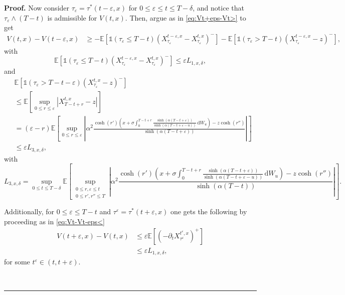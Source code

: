 \documentclass{tufte-handout}
\newcommand{\E}{\mathbb{E}} %
\newenvironment{pf}[1][Proof]{\textbf{#1.} }{\ \rule{0.5em}{0.5em}}
\begin{document}
\begin{pf}
		Now consider $\tau_\varepsilon = \tau^*(t - \varepsilon, x)$ for $0 \leq \varepsilon \leq t \leq T - \delta$, and notice that $\tau_\varepsilon\wedge(T - t)$ is admissible for $V(t, x)$. Then, argue as in \eqref{eq:Vt+eps-Vt>} to get
		\begin{align*}
		V(t, x) - V(t - \varepsilon, x)
		&\geq -\E\left[\mathbb{1}(\tau_\varepsilon\leq T - t)\left(X_{\tau_\varepsilon}^{t - \varepsilon, x} - X_{\tau_\varepsilon}^{t, x}\right)^-\right] - \E\left[\mathbb{1}(\tau_\varepsilon > T - t)\left(X_{\tau_\varepsilon}^{t - \varepsilon, x} - z\right)^-\right],
		\end{align*}
		with
		$$
		\E\left[\mathbb{1}(\tau_\varepsilon\leq T - t)\left(X_{\tau_\varepsilon}^{t - \varepsilon, x} - X_{\tau_\varepsilon}^{t, x}\right)^-\right] \leq \varepsilon L_{1, x, \delta},
		$$ 
		and
		\begin{align*}
		&\E\left[\mathbb{1}(\tau_\varepsilon > T - t - \varepsilon)\left(X_{\tau_\varepsilon}^{t, x} - z\right)^-\right] \\
		&\leq \E\left[\sup_{0 \leq r\leq \varepsilon}\left|X_{T - t + r}^{t, x} - z\right|\right] \\
		&= (\varepsilon - r)\E\left[\sup_{0 \leq r\leq \varepsilon}\left|\alpha^2\frac{\cosh(r')\left(x + \sigma\int_{0}^{T - t + r} \frac{\sinh(\alpha (T - t + \varepsilon))}{\sinh(\alpha (T - t + \varepsilon - u))}\,\mathrm{d}W_u\right) - z\cosh(r'')}{\sinh(\alpha (T - t + \varepsilon))}\right|\right] \\
		&\leq  \varepsilon L_{3, x, \delta},
		\end{align*}
		with
		$$
		L_{3, x, \delta} = \sup_{0\leq t\leq T - \delta} \E\left[\sup_{\substack{0 \leq r, \varepsilon\leq t \\ 0 \leq r', r''\leq T}}\left|\alpha^2\frac{\cosh(r')\left(x + \sigma\int_{0}^{T - t + r} \frac{\sinh(\alpha (T - t + \varepsilon))}{\sinh(\alpha (T - t + \varepsilon - u))}\,\mathrm{d}W_u\right) - z\cosh(r'')}{\sinh(\alpha (T - t))}\right|\right].
		$$
		
		Additionally, for $0 \leq \varepsilon \leq T - t $ and $\tau^\varepsilon = \tau^*(t + \varepsilon, x)$ one gets the following by proceeding as in \eqref{eq:Vt-Vt-eps<}
		\begin{align}
		V(t + \varepsilon, x) - V(t, x) 
		&\leq \varepsilon\E\left[\left(-\partial_tX_{\tau^\varepsilon}^{t^\varepsilon, x}\right)^+\right] \nonumber \\
		&\leq  \varepsilon L_{1, x, \delta},
		\end{align}
		for some $t^{\varepsilon}\in(t, t + \varepsilon)$.
		

\end{pf}
\end{document}
